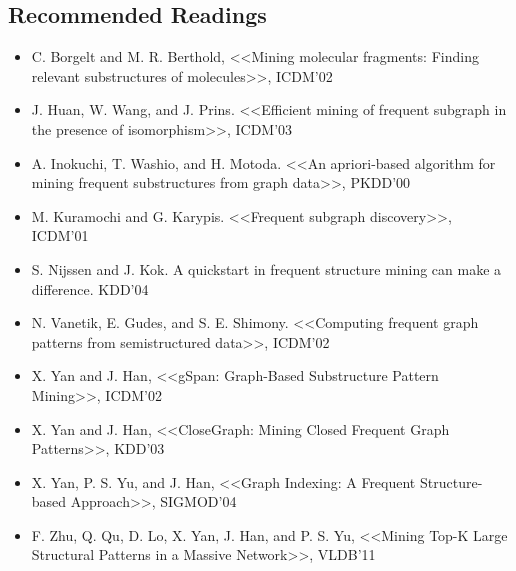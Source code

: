 \subsection{Recommended Readings}
\begin{itemize}
\item C. Borgelt and M. R. Berthold, <<Mining molecular fragments: Finding relevant substructures of molecules>>, ICDM'02
\item J. Huan, W. Wang, and J. Prins. <<Efficient mining of frequent subgraph in the presence of isomorphism>>, ICDM'03
\item A. Inokuchi, T. Washio, and H. Motoda. <<An apriori-based algorithm for mining frequent substructures from graph data>>, PKDD'00
\item M. Kuramochi and G. Karypis. <<Frequent subgraph discovery>>, ICDM'01
\item S. Nijssen and J. Kok. A quickstart in frequent structure mining can make a difference. KDD'04
\item N. Vanetik, E. Gudes, and S. E. Shimony. <<Computing frequent graph patterns from semistructured data>>, ICDM'02
\item X. Yan and J. Han, <<gSpan: Graph-Based Substructure Pattern Mining>>, ICDM'02
\item X. Yan and J. Han, <<CloseGraph: Mining Closed Frequent Graph Patterns>>, KDD'03
\item X. Yan, P. S. Yu, and J. Han, <<Graph Indexing: A Frequent Structure-based Approach>>, SIGMOD'04
\item F. Zhu, Q. Qu, D. Lo, X. Yan, J. Han, and P. S. Yu, <<Mining Top-K Large Structural Patterns in a Massive Network>>, VLDB'11
\end{itemize}
